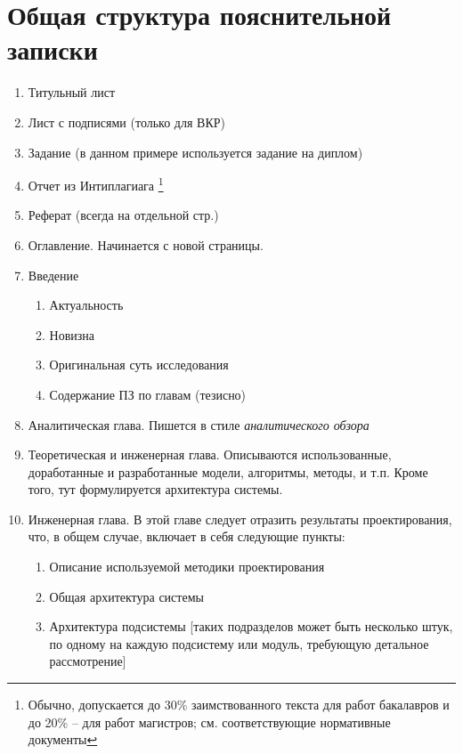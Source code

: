 ﻿\chapter{Общая структура пояснительной записки}\label{app-structure}


\begin{enumerate}
	\item Титульный лист %
	\item Лист с подписями (только для ВКР)
	\item Задание (в данном примере используется задание на диплом)
	\item Отчет из Интиплагиага \footnote{Обычно, допускается до 30\% заимствованного текста для работ бакалавров и до 20\% -- для работ магистров; см. соответствующие нормативные документы}
	\item Реферат (всегда на отдельной стр.)%
	\item Оглавление. Начинается с новой страницы. %
	\item Введение
	\begin{enumerate}
		\item Актуальность
		\item Новизна
		\item Оригинальная суть исследования
		\item Содержание ПЗ по главам (тезисно)
	\end{enumerate}
	\item Аналитическая глава. Пишется в стиле \textit{аналитического обзора}
	\item Теоретическая и инженерная глава. Описываются использованные, доработанные и разработанные модели, алгоритмы, методы, и т.п. Кроме того, тут формулируется архитектура системы.
	\item Инженерная глава. В этой главе следует отразить результаты проектирования, что, в общем случае, включает в себя следующие пункты:
	\begin{enumerate}
		\item Описание используемой методики проектирования
		\item Общая архитектура системы
		\item Архитектура подсистемы [таких подразделов может быть несколько штук, по одному на каждую подсистему или модуль, требующую детальное рассмотрение]

\end{enumerate}
\end{enumerate}
